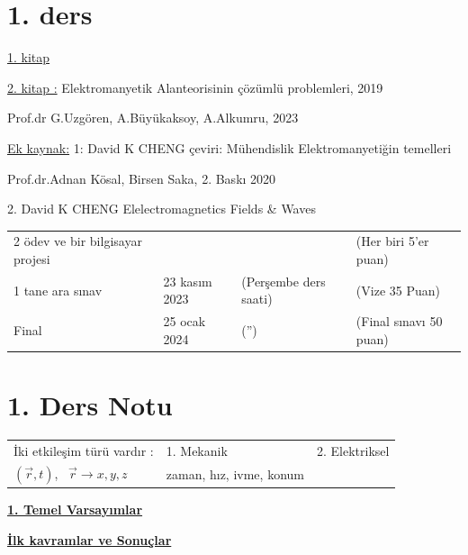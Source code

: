 \documentclass[11pt,a4paper]{article}
\begin{document}

\section{1. ders}
\underline{1. kitap}

\underline{2. kitap :} Elektromanyetik Alanteorisinin çözümlü problemleri, 2019

\hspace{1.5em}Prof.dr G.Uzgören, A.Büyükaksoy, A.Alkumru\hfill , 2023

\underline{Ek kaynak:} 1: David K CHENG çeviri: Mühendislik Elektromanyetiğin temelleri

\hspace{1.5em}Prof.dr.Adnan Kösal, Birsen Saka, 2. Baskı 2020

\hspace{1.5em}2. David K CHENG \quad Elelectromagnetics Fields \& Waves

\medskip
\noindent
\begin{tabular}{@{}l@{\quad}l@{\quad}l@{\quad}l@{}}
  2 ödev ve bir bilgisayar projesi & & & (Her biri 5'er puan) \\
  1 tane ara sınav & 23 kasım 2023 & (Perşembe ders saati) & (Vize 35 Puan) \\
  Final & 25 ocak 2024 & (\hspace{2em}''\hspace{2em}) & (Final sınavı 50 puan) \\
\end{tabular}

\section{1. Ders Notu}
\noindent
\begin{tabular}{@{}l@{\qquad}l@{\qquad}l@{}}
  İki etkileşim türü vardır : & 1. Mekanik & 2. Elektriksel \\
  $(\vec{r},t)$, \ $\vec{r}\to x,y,z$ & zaman, hız, ivme, konum & \\
\end{tabular}

\medskip
\noindent
\begin{minipage}[t]{0.47\linewidth}
  \textbf{\underline{1. Temel Varsayımlar}}
\end{minipage}\hfill
\begin{minipage}[t]{0.47\linewidth}
  \textbf{\underline{İlk kavramlar ve Sonuçlar}}
\end{minipage}


\end{document}
